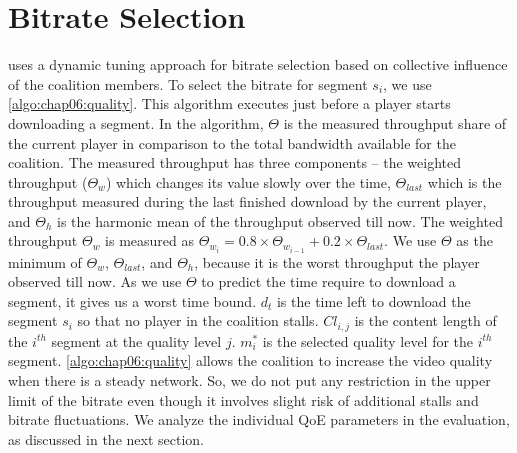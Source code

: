 \section{Bitrate Selection}
\label{sec:chap06:bitrateselection}
{\our} uses a dynamic tuning approach for bitrate selection based on collective influence of the coalition members. To select the bitrate for segment $s_i$, we use \algo\ref{algo:chap06:quality}. This algorithm executes just before a player starts downloading a segment. In the algorithm, $\varTheta$ is the measured throughput share of the current player in comparison to the total bandwidth available for the coalition. The measured throughput has three components -- the weighted throughput ($\varTheta_w$) which changes its value slowly over the time,  $\varTheta_{last}$ which is the throughput measured during the last finished download by the current player, and $\varTheta_h$ is the harmonic mean of the throughput observed till now. The weighted throughput $\varTheta_{w}$ is measured as $\varTheta_{w_i} = 0.8 \times \varTheta_{w_{i-1}} + 0.2 \times \varTheta_{last}$. We use $\varTheta$ as the minimum of $\varTheta_w$, $\varTheta_{last}$, and $\varTheta_h$, because it is the worst throughput the player observed till now. As we use $\varTheta$ to predict the time require to download a segment, it gives us a worst time bound. $d_t$ is the time left to download the segment $s_i$ so that no player in the coalition stalls. $Cl_{i,j}$ is the content length of the $i^{th}$ segment at the quality level $j$. $m^*_i$ is the selected quality level for the $i^{th}$ segment. \algo\ref{algo:chap06:quality} allows the coalition to increase the video quality when there is a steady network. So, we do not put any restriction in the upper limit of the bitrate even though it involves slight risk of additional stalls and bitrate fluctuations. We analyze the individual QoE parameters in the evaluation, as discussed in the next section.